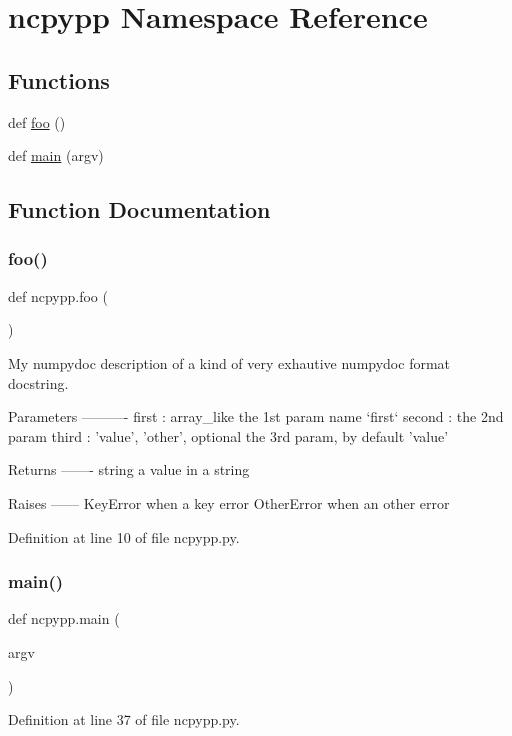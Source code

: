 \hypertarget{namespacencpypp}{}\section{ncpypp Namespace Reference}
\label{namespacencpypp}
\subsection*{Functions}
\begin{DoxyCompactItemize}
\item 
def \hyperlink{namespacencpypp_a9096b20ec561601b43f2e5d7d767d786}{foo} ()
\item 
def \hyperlink{namespacencpypp_adabbc623ee9dfc257e098933f580a2a4}{main} (argv)
\end{DoxyCompactItemize}


\subsection{Function Documentation}
\hypertarget{namespacencpypp_a9096b20ec561601b43f2e5d7d767d786}{}\label{namespacencpypp_a9096b20ec561601b43f2e5d7d767d786} 
\subsubsection{\texorpdfstring{foo()}{foo()}}
{\footnotesize\ttfamily def ncpypp.\+foo (\begin{DoxyParamCaption}{ }\end{DoxyParamCaption})}

\begin{DoxyVerb}My numpydoc description of a kind of very exhautive numpydoc format docstring.

Parameters
----------
first : array_like
    the 1st param name `first`
second :
    the 2nd param
third : {'value', 'other'}, optional
    the 3rd param, by default 'value'

Returns
-------
string
    a value in a string

Raises
------
KeyError
    when a key error
OtherError
when an other error
\end{DoxyVerb}
 

Definition at line 10 of file ncpypp.\+py.

\hypertarget{namespacencpypp_adabbc623ee9dfc257e098933f580a2a4}{}\label{namespacencpypp_adabbc623ee9dfc257e098933f580a2a4} 
\subsubsection{\texorpdfstring{main()}{main()}}
{\footnotesize\ttfamily def ncpypp.\+main (\begin{DoxyParamCaption}\item[{}]{argv }\end{DoxyParamCaption})}



Definition at line 37 of file ncpypp.\+py.


